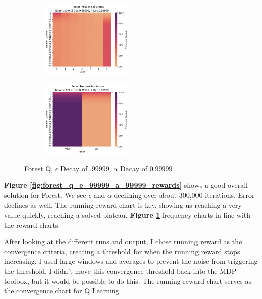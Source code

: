 \documentclass[letterpaper]{article} %
\begin{document}
\begin{figure}[!htb]
	\begin{subfigure}[b]{0.25\textwidth}
		\centering
		\includegraphics[width=1.75in]{Figures/Forest_Frequencies_States_Gamma_0_9__E_Dec_0_99999__A_Dec_0_99999.png}
  	\end{subfigure}%
	\begin{subfigure}[b]{0.25\textwidth}
		\centering
		\includegraphics[width=1.75in]{Figures/Forest_Frequencies_Actions_Gamma_0_9__E_Dec_0_99999__A_Dec_0_99999.png}
  	\end{subfigure}%
\caption{Forest Q,  $\epsilon$ Decay of .99999, $\alpha$ Decay of 0.99999}
\label{fig:forest_q_e_99999_a_99999_frequencies}
\end{figure}

\textbf{Figure \ref{fig:forest_q_e_99999_a_99999_rewards}} shows a good overall solution for Forest.  We see $\epsilon$ and $\alpha$ declining over about 300,000 iterations.  Error declines as well.  The running reward chart is key, showing us reaching a very value quickly, reaching a solved plateau.   \textbf{Figure \ref{fig:forest_q_e_99999_a_99999_frequencies}} frequency charts in line with the reward charts.  

After looking at the different runs and output, I chose running reward as the convergence criteria, creating a threshold for when the running reward stops increasing.  I used large windows and averages to prevent the noise from triggering the threshold.  I didn't move this convergence threshold back into the MDP toolbox, but it would be possible to do this.  The running reward chart serves as the convergence chart for Q Learning.
\end{document}
